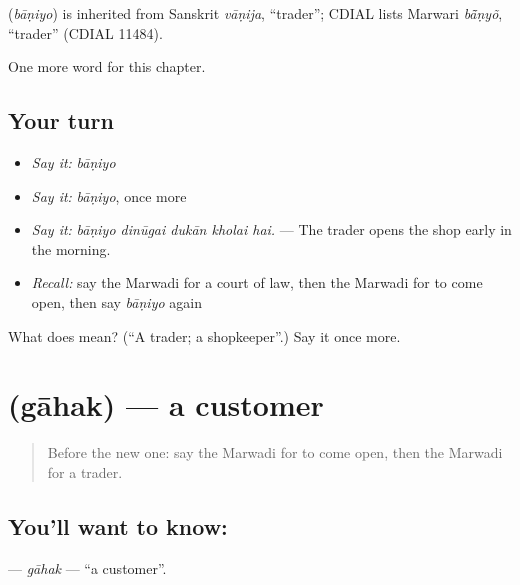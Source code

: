 \begin{cousinweb}
\textbf{} (\emph{bāṇiyo}) is inherited from Sanskrit \emph{vāṇija}, \textquotedblleft{}trader\textquotedblright{}; CDIAL lists Marwari \emph{bā̃ṇyõ}, \textquotedblleft{}trader\textquotedblright{} (CDIAL 11484).
\end{cousinweb}

\begin{grammarlens}[title={What you've built}]
One more word for this chapter.
\end{grammarlens}

\subsection*{Your turn}
\begin{itemize}
\raggedright
  \item \emph{Say it:} \emph{bāṇiyo}
  \item \emph{Say it:} \emph{bāṇiyo}, once more
  \item \emph{Say it:} \emph{bāṇiyo dinūgai dukān kholai hai.} — The trader opens the shop early in the morning.
  \item \emph{Recall:} say the Marwadi for a court of law, then the Marwadi for to come open, then say \emph{bāṇiyo} again
\end{itemize}

\begin{tcolorbox}[breakable,colback=teal!4,colframe=teal!35!black,title={Before you move on}]
What does  mean? (\textquotedblleft{}A trader; a shopkeeper\textquotedblright{}.) Say it once more.
\end{tcolorbox}
\section[\texorpdfstring{\mw{गाहक} (gāhak)}{गाहक (gāhak)}]{ (gāhak) — a customer}

\label{lesson:MW-C209-gahak}



\begin{quote}
Before the new one: say the Marwadi for to come open, then the Marwadi for a trader.
\end{quote}

\subsection*{You'll want to know: }
\textbf{} — \emph{gāhak} — \textquotedblleft{}a customer\textquotedblright{}.

